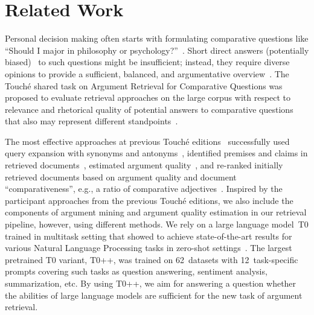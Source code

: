 \section{Related Work}

Personal decision making often starts with formulating comparative questions like ``Should I major in philosophy or psychology?''~\cite{BondarenkoFBGAPBSWPH2020,BondarenkoGFBAPBSWPH2021,BondarenkoFKSGBPBSWPH2022}. Short direct answers (potentially biased)~\cite{PotthastHS2020} to such questions might be insufficient; instead, they require diverse opinions to provide a sufficient, balanced, and argumentative overview~\cite{BondarenkoFBGAPBSWPH2020}.
The Touché shared task on Argument Retrieval for Comparative Questions was proposed to evaluate retrieval approaches on the large corpus with respect to relevance and rhetorical quality of potential answers to comparative questions that also may represent different standpoints~\cite{BondarenkoADHBH22}.

The most effective approaches at previous Touché editions~\cite{BondarenkoFBGAPBSWPH2020,BondarenkoGFBAPBSWPH2021} successfully used query expansion with synonyms and antonyms~\cite{AbyeST2020}, identified premises and claims in retrieved documents~\cite{Huck2020, ShirshakovaW2021}, estimated argument quality~\cite{AbyeST2020}, and re-ranked initially retrieved documents based on argument quality and document ``comparativeness'', e.g., a ratio of comparative adjectives~\cite{ChekalinaP2021}. Inspired by the participant approaches from the previous Touch{\'e} editions, we also include the components of argument mining and argument quality estimation in our retrieval pipeline, however, using different methods.
We rely on a large language model~T0 trained in multitask setting that showed to achieve state-of-the-art results for various Natural Language Processing tasks in zero-shot settings~\cite{SanhWRBSACSLRDBXTSSKCNDCJWMSYPBWNRSSFFTBGBWR2021}. The largest pretrained T0 variant, T0++, was trained on 62~datasets with 12~task-specific prompts covering such tasks as question answering, sentiment analysis, summarization, etc. By using T0++, we aim for answering a question whether the abilities of large language models are sufficient for the new task of argument retrieval.

